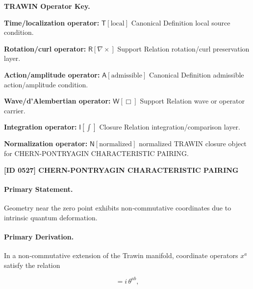 \par\vspace{0.45\baselineskip}
\noindent\begin{minipage}[t]{\linewidth}
\begingroup
\small
\raggedright
\textbf{TRAWIN Operator Key.}\par
\noindent\textbf{Time/localization operator:} $\mathsf{T}\!\left[\mathrm{local}\right]$ Canonical Definition local source condition.\par
\noindent\textbf{Rotation/curl operator:} $\mathsf{R}\!\left[\nabla\times\right]$ Support Relation rotation/curl preservation layer.\par
\noindent\textbf{Action/amplitude operator:} $\mathsf{A}\!\left[\mathrm{admissible}\right]$ Canonical Definition admissible action/amplitude condition.\par
\noindent\textbf{Wave/d'Alembertian operator:} $\mathsf{W}\!\left[\Box\right]$ Support Relation wave or operator carrier.\par
\noindent\textbf{Integration operator:} $\mathsf{I}\!\left[\int\right]$ Closure Relation integration/comparison layer.\par
\noindent\textbf{Normalization operator:} $\mathsf{N}\!\left[\mathrm{normalized}\right]$ normalized TRAWIN closure object for CHERN-PONTRYAGIN CHARACTERISTIC PAIRING.\par
\endgroup
\end{minipage}

\clearpage
\noindent\textbf{[ID 0527] CHERN-PONTRYAGIN CHARACTERISTIC PAIRING}\par
\vspace{0.35em}
\paragraph{Primary Statement.}

Geometry near the zero point exhibits non‑commutative coordinates due to intrinsic quantum deformation.

\paragraph{Primary Derivation.}

In a non‑commutative extension of the Trawin manifold, coordinate operators $x^a$ satisfy the relation

\begin{equation}
[ x^a , x^b ] = i\,\theta^{ab},
\end{equation}

